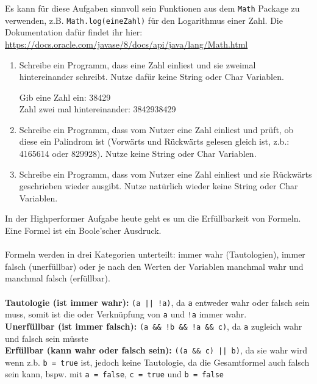 \documentclass{../../sheet}
\begin{document}
Es kann für diese Aufgaben sinnvoll sein Funktionen aus dem \texttt{Math} Package zu verwenden, z.B. \texttt{Math.log(eineZahl)} für den Logarithmus einer Zahl. Die Dokumentation dafür findet ihr hier: \url{https://docs.oracle.com/javase/8/docs/api/java/lang/Math.html}
\begin{enumerate}
    \item Schreibe ein Programm, dass eine Zahl einliest und sie zweimal hintereinander schreibt. Nutze dafür keine String oder Char Variablen.
    \begin{ausgabe}
Gib eine Zahl ein: 38429\\
Zahl zwei mal hintereinander: 3842938429
    \end{ausgabe}
    \item Schreibe ein Programm, dass vom Nutzer eine Zahl einliest und prüft, ob diese ein Palindrom ist (Vorwärts und Rückwärts gelesen gleich ist, z.b.: 4165614 oder 829928). Nutze keine String oder Char Variablen.
    \item Schreibe ein Programm, dass vom Nutzer eine Zahl einliest und sie Rückwärts geschrieben wieder ausgibt. Nutze natürlich wieder keine String oder Char Variablen.
\end{enumerate}

\newpage
{}
In der Highperformer Aufgabe heute geht es um die Erfüllbarkeit von Formeln. Eine Formel ist ein Boole'scher Ausdruck. 
\\\\
Formeln werden in drei Kategorien unterteilt: immer wahr (Tautologien), immer falsch (unerfüllbar) oder je nach den Werten der Variablen manchmal wahr und manchmal falsch (erfüllbar).
\\\\
\textbf{Tautologie (ist immer wahr): } \texttt{(a || !a)}, da \texttt{a} entweder wahr oder falsch sein muss, somit ist die oder Verknüpfung von \texttt{a} und \texttt{!a} immer wahr.\\
\textbf{Unerfüllbar (ist immer falsch): } \texttt{(a \&\& !b \&\& !a \&\& c)}, da \texttt{a} zugleich wahr und falsch sein müsste\\
\textbf{Erfüllbar (kann wahr oder falsch sein): } \texttt{((a \&\& c) || b)}, da sie wahr wird wenn z.b. \texttt{b = true} ist, jedoch keine Tautologie, da die Gesamtformel auch falsch sein kann, bspw. mit \texttt{a = false}, \texttt{c = true} und \texttt{b = false}
\end{document}
